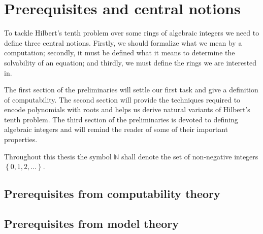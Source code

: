 \documentclass[12pt, a4paper, numbers=noenddot]{scrbook}
\numberwithin{equation}{section}
\newcommand{\set}[1]{\left\lbrace #1 \right\rbrace}
\begin{document}


\allowdisplaybreaks

\frontmatter



\mainmatter

\chapter{Prerequisites and central notions}

To tackle Hilbert's tenth problem over some rings of algebraic integers we need
to define three central notions. Firstly, we should formalize what we mean by a
computation; secondly, it must be defined what it means to determine the
solvability of an equation; and thirdly, we must define the rings we are
interested in.

The first section of the preliminaries will settle our first task and give a
definition of computability. The second section will provide the techniques
required to encode polynomials with roots and helps us derive natural variants
of Hilbert's tenth problem. The third section of the preliminaries is devoted to
defining algebraic integers and will remind the reader of some of their
important properties.

Throughout this thesis the symbol \(ℕ\) shall denote the set of non-negative
integers \(\set{0, 1, 2, …}\).

\section{Prerequisites from computability theory}%
\label{sec:computability theory}


\section{Prerequisites from model theory}\label{sec:model theory}

\end{document}
